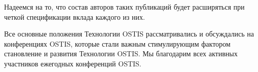 \begin{SCn}
{Надеемся на то, что состав авторов таких публикаций будет расширяться при четкой спецификации вклада каждого из них. 

Все основные положения Технологии OSTIS рассматривались и обсуждались на конференциях OSTIS, которые стали важным стимулирующим фактором становление и развития Технологии OSTIS. Мы благодарим всех активных участников ежегодных конференций OSTIS.
}

\end{SCn}
